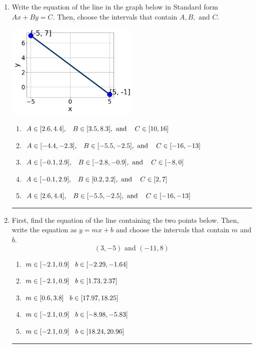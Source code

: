 \documentclass[14pt]{extbook}
\newcommand{\litem}[1]{\item#1\hspace*{-1cm}\rule{\textwidth}{0.4pt}}
\begin{document}
\begin{enumerate}
\litem{
Write the equation of the line in the graph below in Standard form $Ax+By=C$. Then, choose the intervals that contain $A, B, \text{ and } C$.
\begin{center}
    \includegraphics[width=0.5\textwidth]{../Figures/linearGraphToStandardC.png}
\end{center}
\begin{enumerate}[label=\Alph*.]
\item \( A \in [2.6, 4.4], \hspace{3mm} B \in [3.5, 8.3], \text{ and } \hspace{3mm} C \in [10, 16] \)
\item \( A \in [-4.4, -2.3], \hspace{3mm} B \in [-5.5, -2.5], \text{ and } \hspace{3mm} C \in [-16, -13] \)
\item \( A \in [-0.1, 2.9], \hspace{3mm} B \in [-2.8, -0.9], \text{ and } \hspace{3mm} C \in [-8, 0] \)
\item \( A \in [-0.1, 2.9], \hspace{3mm} B \in [0.2, 2.2], \text{ and } \hspace{3mm} C \in [2, 7] \)
\item \( A \in [2.6, 4.4], \hspace{3mm} B \in [-5.5, -2.5], \text{ and } \hspace{3mm} C \in [-16, -13] \)

\end{enumerate} }
\litem{
First, find the equation of the line containing the two points below. Then, write the equation as $ y=mx+b $ and choose the intervals that contain $m$ and $b$.\[ (3, -5) \text{ and } (-11, 8) \]\begin{enumerate}[label=\Alph*.]
\item \( m \in [-2.1, 0.9] \hspace*{3mm} b \in [-2.29, -1.64] \)
\item \( m \in [-2.1, 0.9] \hspace*{3mm} b \in [1.73, 2.37] \)
\item \( m \in [0.6, 3.8] \hspace*{3mm} b \in [17.97, 18.25] \)
\item \( m \in [-2.1, 0.9] \hspace*{3mm} b \in [-8.98, -5.83] \)
\item \( m \in [-2.1, 0.9] \hspace*{3mm} b \in [18.24, 20.96] \)


\end{enumerate}}
\end{enumerate}
\end{document}
